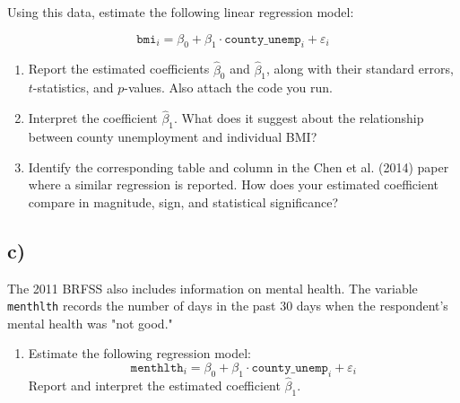 \documentclass[12pt]{article}
\begin{document}
Using this data, estimate the following linear regression model:

\[
\texttt{bmi}_i = \beta_0 + \beta_1 \cdot \texttt{county\_unemp}_i + \varepsilon_i
\]

\begin{enumerate}
    \item Report the estimated coefficients $\hat\beta_0$ and $\hat\beta_1$, along with their standard errors, $t$-statistics, and $p$-values. Also attach the code you run. 
    
    \item Interpret the coefficient $\hat\beta_1$. What does it suggest about the relationship between county unemployment and individual BMI?

    \item Identify the corresponding table and column in the Chen et al. (2014) paper where a similar regression is reported. How does your estimated coefficient compare in magnitude, sign, and statistical significance?
\end{enumerate}

\subsection*{c)}

The 2011 BRFSS also includes information on mental health. The variable \texttt{menthlth} records the number of days in the past 30 days when the respondent’s mental health was "not good."

\begin{enumerate}
    \item Estimate the following regression model:
    \[
    \texttt{menthlth}_i = \beta_0 + \beta_1 \cdot \texttt{county\_unemp}_i + \varepsilon_i
    \]
    Report and interpret the estimated coefficient $\hat\beta_1$.
\end{enumerate}
\end{document}
